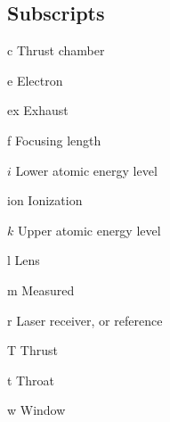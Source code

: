 \begin{multicols}{2}
    \section*{Subscripts}
    \begin{nomlist}
        \item[c]                Thrust chamber
        \item[e]                Electron
        \item[ex]               Exhaust
        \item[f]                Focusing length
        \item[$i$]              Lower atomic energy level 
        \item[ion]              Ionization
        \item[$k$]              Upper atomic energy level 
        \item[l]                Lens
        \item[m]                Measured
        \item[r]                Laser receiver, or reference
        \item[T]                Thrust
        \item[t]                Throat
        \item[w]                Window
    \end{nomlist}


\end{multicols}